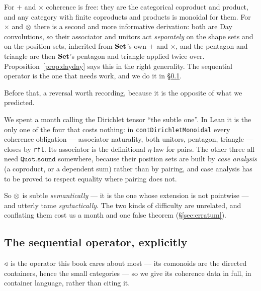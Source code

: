 For $+$ and $\times$ coherence is free: they are the categorical coproduct and
product, and any category with finite coproducts and products is monoidal for
them. For $\times$ and $\mathbin{\otimes}$ there is a second and more informative derivation:
both are Day convolutions, so their associator and unitors act
\emph{separately} on the shape sets and on the position sets, inherited from
$\mathbf{Set}$'s own $+$ and $\times$, and the pentagon and triangle are then $\mathbf{Set}$'s
pentagon and triangle applied twice over. Proposition~\ref{prop:dayday} says
this in the right generality. The sequential operator is the one that needs
work, and we do it in §\ref{sec:seq}.

Before that, a reversal worth recording, because it is the opposite of what we
predicted.

\begin{Remark}
\label{rem:tame}
We spent a month calling the Dirichlet tensor ``the subtle one''. In Lean it is
the only one of the four that costs nothing: in
\texttt{contDirichletMonoidal} every coherence obligation ---
associator naturality, both unitors, pentagon, triangle --- closes by
\texttt{rfl}. Its associator is the definitional $\eta$-law for pairs. The other
three all need $\texttt{Quot.sound}$ somewhere, because their position sets are
built by \emph{case analysis} (a coproduct, or a dependent sum) rather than by
pairing, and case analysis has to be proved to respect equality where pairing
does not.

So $\mathbin{\otimes}$ is subtle \emph{semantically} --- it is the one whose extension is not
pointwise --- and utterly tame \emph{syntactically}. The two kinds of difficulty
are unrelated, and conflating them cost us a month and one false theorem
(§\ref{sec:erratum}).
\end{Remark}

\subsection{The sequential operator, explicitly}
\label{sec:seq}

$\mathbin{\triangleleft}$ is the operator this book cares about most --- its comonoids are the
directed containers, hence the small categories --- so we give its coherence
data in full, in container language, rather than citing it.

